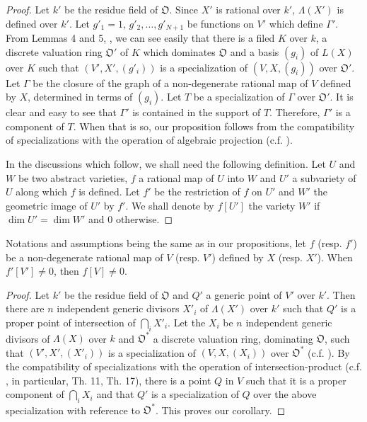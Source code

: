 \begin{proof}
Let $k'$ be the residue field of $\mathfrak{O}$. Since $X'$ is rational over $k'$, $\Lambda(X')$ is defined over $k'$. Let $g'_{1}=1$, $g'_{2},\ldots,g'_{N+1}$ be functions on $V'$ which define $\Gamma'$. From Lemmas 4 and 5, \cite{art14-key16}, we can see easily that there is a filed $K$ over $k$, a discrete valuation ring $\mathfrak{O}'$ of $K$ which dominates $\mathfrak{O}$ and a basis $(g_{i})$ of $L(X)$ over $K$ such that $(V',X',(g'_{i}))$ is a specialization of $(V,X,(g_{i}))$ over $\mathfrak{O}'$. Let $\Gamma$ be the closure of the graph of a non-degenerate rational map of $V$ defined by $X$, determined in terms of $(g_{i})$. Let $T$ be a specialization of $\Gamma$ over $\mathfrak{O}'$. It is clear and easy to see that $\Gamma'$ is contained in the support of $T$. Therefore, $\Gamma'$ is a component of $T$. When that is so, our proposition follows from the compatibility of specializations with the operation of algebraic projection (c.f. \cite{art14-key24}).

In the discussions which follow, we shall need the following definition. Let $U$ and $W$ be two abstract varieties, $f$ a rational map of $U$ into $W$ and $U'$ a subvariety of $U$ along which $f$ is defined. Let $f'$ be the restriction of $f$ on $U'$ and $W'$ the geometric image of $U'$ by $f'$. We shall denote by $f[U']$ the variety $W'$ if $\dim U'=\dim W'$ and $0$ otherwise.
\end{proof}

\begin{coro*}
Notations and assumptions being the same as in our propositions, let $f$ (resp. $f'$) be a non-degenerate rational map of $V$ (resp. $V'$) defined by $X$ (resp. $X'$). When $f'[V']\neq 0$, then $f[V]\neq 0$.
\end{coro*}

\begin{proof}
Let $k'$ be the residue field of $\mathfrak{O}$ and $Q'$ a generic point of $V'$ over $k'$. Then there are $n$ independent generic divisors $X'_{i}$ of $\Lambda(X')$ over $k'$ such that $Q'$ is a proper point of intersection of $\bigcap_{i}X'_{i}$. Let the $X_{i}$ be $n$ independent generic divisors of $\Lambda(X)$ over $k$ and $\mathfrak{O}^{*}$ a discrete valuation ring, dominating $\mathfrak{O}$, such that $(V',X',(X'_{i}))$ is a specialization of $(V,X,(X_{i}))$ over $\mathfrak{O}^{*}$ (c.f. \cite{art14-key16}). By the compatibility of specializations with the operation of intersection-product (c.f. \cite{art14-key24}, in particular, Th. 11, Th. 17), there is a point $Q$ in $V$ such that it is a proper component of $\bigcap_{i}X_{i}$ and that $Q'$ is a specialization of $Q$ over the above specialization with reference to $\mathfrak{O}^{*}$. This proves our corollary.
\end{proof}

